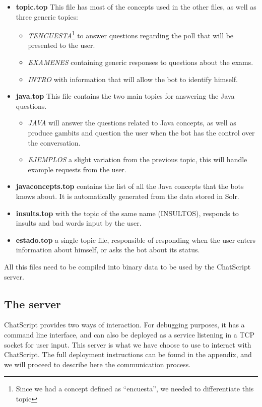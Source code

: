 \begin{itemize}
 \item \textbf{topic.top} This file has most of the concepts used in the other files, as well as three generic topics:
 \begin{itemize}
  \item \emph{TENCUESTA}\footnote{Since we had a concept defined as ``encuesta'', we needed to differentiate this topic} to answer questions regarding the poll that will be presented to the user.
  \item \emph{EXAMENES} containing generic responses to questions about the exams.
  \item \emph{INTRO} with information that will allow the bot to identify himself.
 \end{itemize}
 \item \textbf{java.top} This file contains the two main topics for answering the Java questions.
 \begin{itemize}
  \item \emph{JAVA} will answer the questions related to Java concepts, as well as produce gambits and question the user when the bot has the control over the conversation.
  \item \emph{EJEMPLOS} a slight variation from the previous topic, this will handle example requests from the user.
 \end{itemize}
 \item \textbf{javaconcepts.top} contains the list of all the Java concepts that the bots knows about. It is automatically generated from the data stored in Solr.
 \item \textbf{insults.top} with the topic of the same name (INSULTOS), responds to insults and bad words input by the user.
 \item \textbf{estado.top} a single topic file, responsible of responding when the user enters information about himself, or asks the bot about its status.
\end{itemize}

All this files need to be compiled into binary data to be used by the ChatScript server.

\subsection{The server}
\label{sec:csserver}

ChatScript provides two ways of interaction. For debugging purposes, it has a command line interface, and can also be deployed as a service listening in a TCP socket for user input. This server is what we have choose to use to interact with ChatScript. The full deployment instructions can be found in the appendix, and we will proceed to describe here the communication process.

